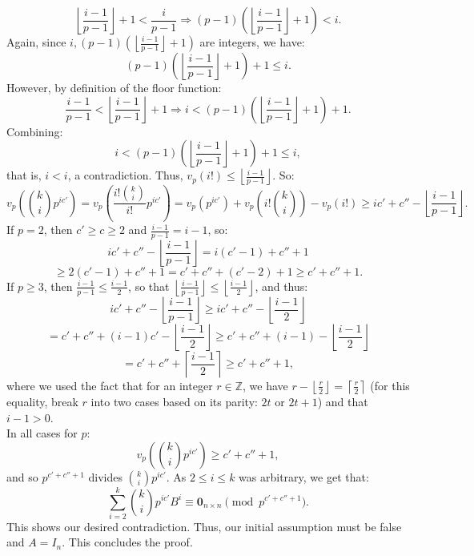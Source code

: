 \documentclass[11pt, a4paper, oneside]{article}
\theoremstyle{remark}
\theoremstyle{lemma}
\begin{document}
\[
\left\lfloor \frac{i-1}{p-1} \right\rfloor + 1 < \frac{i}{p-1} \Rightarrow (p-1)\left( \left\lfloor \frac{i-1}{p-1} \right\rfloor + 1 \right) < i.
\]
Again, since \( i, (p-1)\left( \left\lfloor \frac{i-1}{p-1} \right\rfloor + 1 \right) \) are integers, we have:
\[
(p-1)\left( \left\lfloor \frac{i-1}{p-1} \right\rfloor + 1 \right) + 1 \leq i.
\]
However, by definition of the floor function:
\[
\frac{i-1}{p-1} < \left\lfloor \frac{i-1}{p-1} \right\rfloor + 1 \Rightarrow i < (p-1)\left( \left\lfloor \frac{i-1}{p-1} \right\rfloor + 1 \right) + 1.
\]
Combining:
\[
i < (p-1)\left( \left\lfloor \frac{i-1}{p-1} \right\rfloor + 1 \right) + 1 \leq i,
\]
that is, \( i < i \), a contradiction. Thus, \( v_p(i!) \leq \left\lfloor \frac{i-1}{p-1} \right\rfloor \). So:
\[
v_p\left( \binom{k}{i} p^{i c'} \right) = v_p\left( \frac{i! \binom{k}{i}}{i!} p^{i c'} \right) = v_p\left( p^{i c'} \right) + v_p\left( i! \binom{k}{i} \right) - v_p(i!) \geq i c' + c'' - \left\lfloor \frac{i-1}{p-1} \right\rfloor.
\]
If \( p = 2 \), then \( c' \geq c \geq 2 \) and \( \frac{i-1}{p-1} = i - 1 \), so:
\[
i c' + c'' - \left\lfloor \frac{i-1}{p-1} \right\rfloor = i(c' - 1) + c'' + 1
\]
\[\geq 2(c' - 1) + c'' + 1 = c' + c'' + (c' - 2) + 1 \geq c' + c'' + 1.
\]
If \( p \geq 3 \), then \( \frac{i-1}{p-1} \leq \frac{i-1}{2} \), so that \( \left\lfloor \frac{i-1}{p-1} \right\rfloor \leq \left\lfloor \frac{i-1}{2} \right\rfloor \), and thus:
\[
i c' + c'' - \left\lfloor \frac{i-1}{p-1} \right\rfloor \geq i c' + c'' - \left\lfloor \frac{i-1}{2} \right\rfloor
\]
\[= c' + c'' + (i - 1)c' - \left\lfloor \frac{i-1}{2} \right\rfloor \geq c' + c'' + (i - 1) - \left\lfloor \frac{i-1}{2} \right\rfloor
\]
\[= c' + c'' + \left\lceil \frac{i-1}{2} \right\rceil \geq c' + c'' + 1,
\]
where we used the fact that for an integer \( r \in \mathbb{Z} \), we have \( r - \left\lfloor \frac{r}{2} \right\rfloor = \left\lceil \frac{r}{2} \right\rceil \) (for this equality, break \( r \) into two cases based on its parity: \( 2t \) or \( 2t + 1 \)) and that \( i - 1 > 0 \).
\\
In all cases for $p$:
\[
v_p\left( \binom{k}{i} p^{i c'} \right) \geq c' + c'' + 1,
\]
and so \( p^{c' + c'' + 1} \) divides \( \binom{k}{i} p^{i c'} \). As $2\leq i\leq k$ was arbitrary, we get that:
\[
\sum_{i=2}^{k} \binom{k}{i} p^{i c'} B^i \equiv \mathbf{0}_{n \times n} \pmod{p^{c' + c'' + 1}}.
\]
This shows our desired contradiction. Thus, our initial assumption must be false and \( A = I_n \). This concludes the proof.
\\\\
\end{document}
